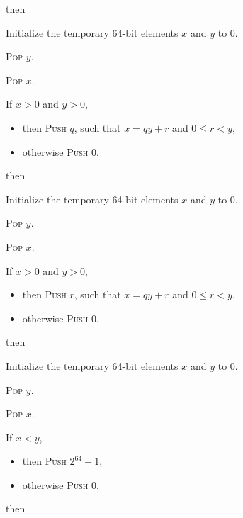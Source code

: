 \documentclass[a4paper,12pt]{article}
\newcommand{\num}[1]{\texttt{#1}}
\newcommand{\hex}[1]{\num{#1}_{\textup{\tiny 16}}}
\newcommand{\proc}[1]{\textsc{#1}}
\newcommand{\op}[1]{$#1$}
\newcommand{\DIV}       [1]{\op{\hex{22}}}
\newcommand{\REM}       [1]{\op{\hex{23}}}
\newcommand{\LT}        [1]{\op{\hex{24}}}
\newcommand{\AND}       [1]{\op{\hex{28}}}
\begin{document}
\begin{stepnumbers}[start=3]
\begin{description}
\begin{stepnumbers}
    \end{stepnumbers}
  \item[\DIV{}] then
    \begin{stepnumbers}
    \item Initialize the temporary 64-bit elements $x$ and $y$ to 0.
    \item \proc{Pop} $y$.
    \item \proc{Pop} $x$.
    \item If $x > 0$ and $y > 0$,
      \begin{itemize}[label=]
      \item then \proc{Push} $q$, such that $x = qy + r$ and $0 \leq r < y$,
      \item otherwise \proc{Push} 0.
      \end{itemize}
    \end{stepnumbers}
  \item[\REM{}] then
    \begin{stepnumbers}
    \item Initialize the temporary 64-bit elements $x$ and $y$ to 0.
    \item \proc{Pop} $y$.
    \item \proc{Pop} $x$.
    \item If $x > 0$ and $y > 0$,
      \begin{itemize}[label=]
      \item then \proc{Push} $r$, such that $x = qy + r$ and $0 \leq r < y$,
      \item otherwise \proc{Push} 0.
      \end{itemize}
    \end{stepnumbers}
  \item[\LT{}] then
    \begin{stepnumbers}
    \item Initialize the temporary 64-bit elements $x$ and $y$ to 0.
    \item \proc{Pop} $y$.
    \item \proc{Pop} $x$.
    \item If $x < y$,
      \begin{itemize}[label=]
      \item then \proc{Push} $2^{64} - 1$,
      \item otherwise \proc{Push} 0.
      \end{itemize}
    \end{stepnumbers}
  \item[\AND{}] then
    \begin{stepnumbers}

\end{stepnumbers}
\end{description}
\end{stepnumbers}
\end{document}

